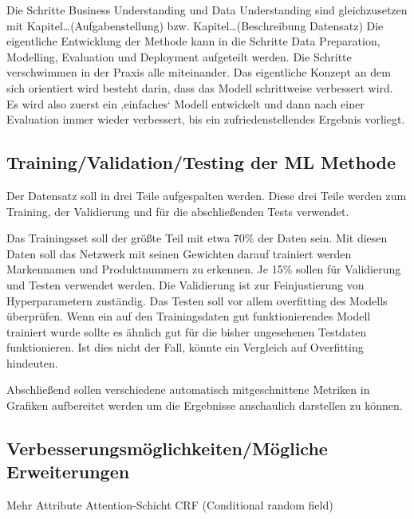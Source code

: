 \documentclass[paper=a4,12pt,listof=totoc]{scrartcl}%
\begin{document}
	Die Schritte Business Understanding und Data Understanding sind gleichzusetzen mit Kapitel…(Aufgabenstellung) bzw. Kapitel…(Beschreibung Datensatz) Die eigentliche Entwicklung der Methode kann in die Schritte Data Preparation, Modelling, Evaluation und Deployment aufgeteilt werden. Die Schritte verschwimmen in der Praxis alle miteinander. Das eigentliche Konzept an dem sich orientiert wird besteht darin, dass das Modell schrittweise verbessert wird. Es wird also zuerst ein ‚einfaches‘ Modell entwickelt und dann nach einer Evaluation immer wieder verbessert, bis ein zufriedenstellendes Ergebnis vorliegt.
	
	\subsection{Training/Validation/Testing der ML Methode} %
	Der Datensatz soll in drei Teile aufgespalten werden. Diese drei Teile werden zum Training, der Validierung und für die abschließenden Tests verwendet. 
	
	Das Trainingsset soll der größte Teil mit etwa 70\% der Daten sein. Mit diesen Daten soll das Netzwerk mit seinen Gewichten darauf trainiert werden Markennamen und Produktnummern zu erkennen.
	Je 15\% sollen für Validierung und Testen verwendet werden.
	Die Validierung ist zur Feinjustierung von Hyperparametern zuständig.
	Das Testen soll vor allem overfitting des Modells überprüfen. Wenn ein auf den Trainingsdaten gut funktionierendes Modell trainiert wurde sollte es ähnlich gut für die bisher ungesehenen Testdaten funktionieren. Ist dies nicht der Fall, könnte ein Vergleich auf Overfitting hindeuten.
	
	Abschließend sollen verschiedene automatisch mitgeschnittene Metriken in Grafiken aufbereitet werden um die Ergebnisse anschaulich darstellen zu können.
		
	\subsection{Verbesserungsmöglichkeiten/Mögliche Erweiterungen} %
	Mehr Attribute
	Attention-Schicht
	CRF (Conditional random field)
	
\end{document}
